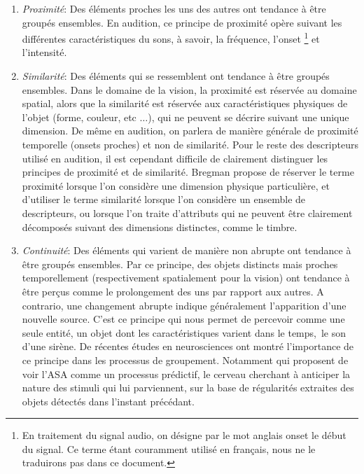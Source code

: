 \begin{enumerate}
\item \emph{Proximité}: Des éléments proches les uns des autres ont tendance à être groupés ensembles. En audition, ce principe de proximité opère suivant les différentes caractéristiques du sons, à savoir, la fréquence, l’onset \footnote{En traitement du signal audio, on désigne par le mot anglais onset le début du signal. Ce terme étant couramment utilisé en français, nous ne le traduirons pas dans ce document.} et l'intensité. 
\item \emph{Similarité}: Des éléments qui se ressemblent ont tendance à être groupés ensembles.
Dans le domaine de la vision, la proximité est réservée au domaine spatial, alors que la similarité est réservée aux caractéristiques physiques de l'objet (forme, couleur, etc $\ldots$), qui ne peuvent se décrire suivant une unique dimension. De même en audition, on parlera de manière générale de proximité temporelle (onsets proches) et non de similarité. Pour le reste des descripteurs utilisé en audition, il est cependant difficile de clairement distinguer les principes de proximité et de similarité. Bregman propose de réserver le terme proximité lorsque l'on considère une dimension physique particulière, et d'utiliser le terme similarité lorsque l'on considère un ensemble de descripteurs, ou lorsque l'on traite d'attributs qui ne peuvent être clairement décomposés suivant des dimensions distinctes, comme le timbre.
\item \emph{Continuité}: Des éléments qui varient de manière non abrupte ont tendance à être groupés ensembles. Par ce principe, des objets distincts mais proches temporellement (respectivement spatialement pour la vision) ont tendance à être perçus comme le prolongement des uns par rapport aux autres. A contrario, une changement abrupte indique généralement l'apparition d'une nouvelle source. C'est ce principe qui nous permet de percevoir comme une seule entité, un objet dont les caractéristiques varient dans le temps,\eg~le son d'une sirène.
De récentes études en neurosciences ont montré l'importance de ce principe dans les processus de groupement. Notamment\citep{winkler2009modeling} qui proposent de voir l'ASA comme un processus prédictif, le cerveau cherchant à anticiper la nature des stimuli qui lui parviennent, sur la base de régularités extraites des objets détectés dans l'instant précédant.

\end{enumerate}
